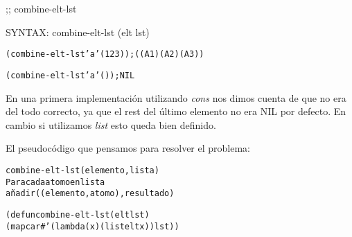 
\begin{aibox}{\function}
;; combine-elt-lst

SYNTAX: combine-elt-lst (elt lst)
\end{aibox}

\begin{aibox}{\examples}

\begin{alltt}
(combine-elt-lst 'a '(1 2 3)); ((A 1) (A 2) (A 3))

(combine-elt-lst 'a '()); NIL
\end{alltt}

\end{aibox}

\begin{aibox}{\comments}
En una primera implementación utilizando \emph{cons} nos dimos cuenta de que no era del todo correcto, ya que el rest del último elemento no era NIL por defecto. En cambio si utilizamos \emph{list} esto queda bien definido.
\end{aibox}
\begin{aibox}{\pseudocode}
El pseudocódigo que pensamos para resolver el problema:

\begin{alltt}
combine-elt-lst (elemento,lista)
    Para cada atomo en lista
        añadir ((elemento,atomo),resultado)
\end{alltt}
\end{aibox}
\begin{aibox}{\code}

\begin{alltt}

(defun combine-elt-lst (elt lst)
            (mapcar #'(lambda (x) (list elt x)) lst))

\end{alltt}
\end{aibox}
